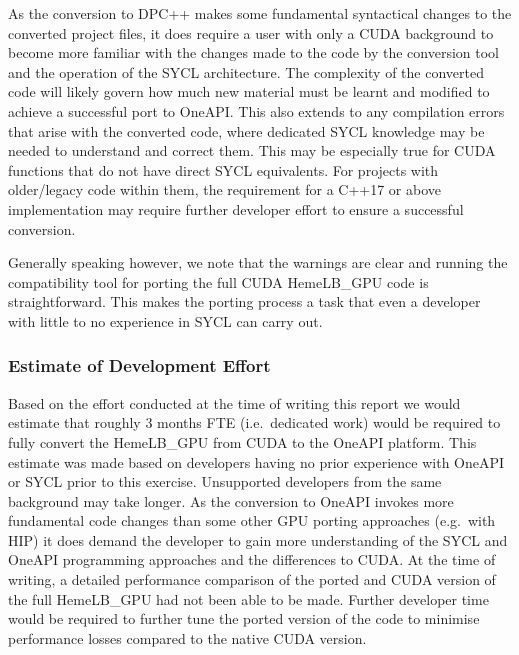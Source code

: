 \documentclass[../main]{subfiles}
\begin{document}
As the conversion to DPC++ makes some fundamental syntactical changes to the converted project files, it does require a user with only a CUDA background to become more familiar with the changes made to the code by the conversion tool and the operation of the SYCL architecture.
The complexity of the converted code will likely govern how much new material must be learnt and modified to achieve a successful port to OneAPI.
This also extends to any compilation errors that arise with the converted code, where dedicated SYCL knowledge may be needed to understand and correct them.
This may be especially true for CUDA functions that do not have direct SYCL equivalents.
For projects with older/legacy code within them, the requirement for a C++17 or above implementation may require further developer effort to ensure a successful conversion.

Generally speaking however, we note that the warnings are clear and running the  compatibility tool for porting the full CUDA HemeLB\_GPU code is straightforward.
This makes the porting process a task that even a developer with little to no experience in SYCL can carry out.

\subsubsection{Estimate of Development Effort}
Based on the effort conducted at the time of writing this report we would estimate that roughly 3 months FTE (i.e.\ dedicated work) would be required to fully convert the HemeLB\_GPU from CUDA to the OneAPI platform.
This estimate was made based on developers having no prior experience with OneAPI or SYCL prior to this exercise.
Unsupported developers from the same background may take longer.
As the conversion to OneAPI invokes more fundamental code changes than some other GPU porting approaches (e.g.\ with HIP) it does demand the developer to gain more understanding of the SYCL and OneAPI programming approaches and the differences to CUDA.
At the time of writing, a detailed performance comparison of the ported and CUDA version of the full HemeLB\_GPU had not been able to be made.
Further developer time would be required to further tune the ported version of the code to minimise performance losses compared to the native CUDA version.
\end{document}
